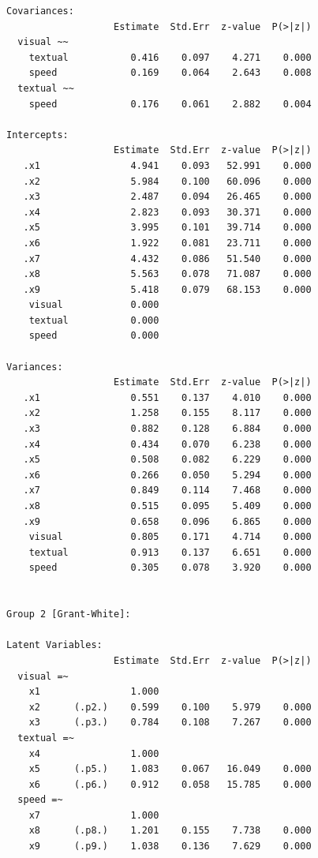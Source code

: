\documentclass[
]{book}
\begin{document}
\begin{verbatim}
Covariances:
                   Estimate  Std.Err  z-value  P(>|z|)
  visual ~~                                           
    textual           0.416    0.097    4.271    0.000
    speed             0.169    0.064    2.643    0.008
  textual ~~                                          
    speed             0.176    0.061    2.882    0.004

Intercepts:
                   Estimate  Std.Err  z-value  P(>|z|)
   .x1                4.941    0.093   52.991    0.000
   .x2                5.984    0.100   60.096    0.000
   .x3                2.487    0.094   26.465    0.000
   .x4                2.823    0.093   30.371    0.000
   .x5                3.995    0.101   39.714    0.000
   .x6                1.922    0.081   23.711    0.000
   .x7                4.432    0.086   51.540    0.000
   .x8                5.563    0.078   71.087    0.000
   .x9                5.418    0.079   68.153    0.000
    visual            0.000                           
    textual           0.000                           
    speed             0.000                           

Variances:
                   Estimate  Std.Err  z-value  P(>|z|)
   .x1                0.551    0.137    4.010    0.000
   .x2                1.258    0.155    8.117    0.000
   .x3                0.882    0.128    6.884    0.000
   .x4                0.434    0.070    6.238    0.000
   .x5                0.508    0.082    6.229    0.000
   .x6                0.266    0.050    5.294    0.000
   .x7                0.849    0.114    7.468    0.000
   .x8                0.515    0.095    5.409    0.000
   .x9                0.658    0.096    6.865    0.000
    visual            0.805    0.171    4.714    0.000
    textual           0.913    0.137    6.651    0.000
    speed             0.305    0.078    3.920    0.000


Group 2 [Grant-White]:

Latent Variables:
                   Estimate  Std.Err  z-value  P(>|z|)
  visual =~                                           
    x1                1.000                           
    x2      (.p2.)    0.599    0.100    5.979    0.000
    x3      (.p3.)    0.784    0.108    7.267    0.000
  textual =~                                          
    x4                1.000                           
    x5      (.p5.)    1.083    0.067   16.049    0.000
    x6      (.p6.)    0.912    0.058   15.785    0.000
  speed =~                                            
    x7                1.000                           
    x8      (.p8.)    1.201    0.155    7.738    0.000
    x9      (.p9.)    1.038    0.136    7.629    0.000


\end{verbatim}
\end{document}
